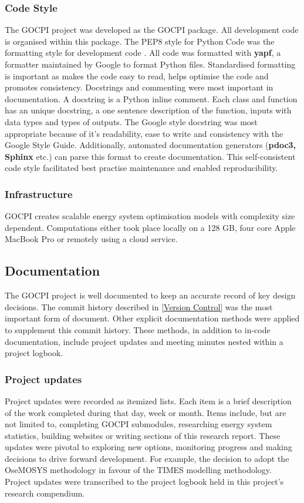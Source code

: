 \documentclass[12pt]{article}
\begin{document}
\subsubsection{Code Style} \label{CS}
The GOCPI project was developed as the GOCPI package. All development code is organised within this package.
The PEP8 style for Python Code was the formatting style for development code \cite{PEP8}. 
All code was formatted with \textbf{yapf}, a formatter maintained by Google to format Python files.
Standardised formatting is important as makes the code easy to read, helps optimise the code and promotes consistency.
Docstrings and commenting were most important in documentation. A docstring is a Python inline comment. 
Each class and function has an unique docstring, a one sentence description of the function, inputs with data types and types of outputs.
The Google style docstring was most appropriate because of it's readability, ease to write and consistency with the Google Style Guide.
Additionally, automated documentation generators (\textbf{pdoc3, Sphinx} etc.) can parse this format to create documentation.
This self-consistent code style facilitated best practise maintenance and enabled reproducibility.

\subsubsection{Infrastructure}
GOCPI creates scalable energy system optimisation models with complexity size dependent.
Computations either took place locally on a 128 GB, four core Apple MacBook Pro or remotely using a cloud service. 

\subsection{Documentation}
The GOCPI project is well documented to keep an accurate record of key design decisions.
The commit history described in \ref{Version Control} was the most important form of document.
Other explicit documentation methods were applied to supplement this commit history. 
These methods, in addition to in-code documentation, include project updates and meeting minutes
nested within a project logbook.

\subsubsection{Project updates}
Project updates were recorded as itemized lists.
Each item is a brief description of the work completed during that day, week or month.
Items include, but are not limited to, completing GOCPI submodules, researching energy system statistics, building websites or writing sections of this research report.
These updates were pivotal to exploring new options, monitoring progress and making decisions to drive forward development. 
For example, the decision to adopt the OseMOSYS methodology in favour of the TIMES modelling methodology.
Project updates were transcribed to the project logbook held in this project's research compendium.
\end{document}

